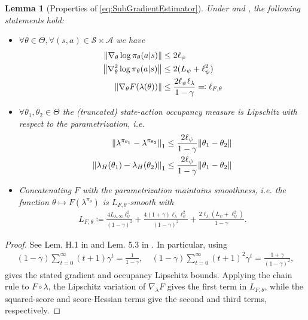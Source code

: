 \documentclass{article}
\theoremstyle{plain}
\newtheorem{lemma}[theorem]{Lemma}
\theoremstyle{definition}
\theoremstyle{remark}
\def\SS{{\mathcal{S}}}
\def\AA{{\mathcal{A}}}
\DeclarePairedDelimiter{\norm}{\lVert}{\rVert}
\newcommand{\define}{\coloneqq}
\newcommand{\defineRev}{\eqqcolon}
\def\ss{{s}}
\def\aa{{a}}
\def\ss{{s}}
\begin{document}
\begin{lemma}[Properties of \eqref{eq:SubGradientEstimator}]
 \label{lem:AppendixScoreFunction}
 Under  and  , the following
 statements hold:
 \begin{itemize}
  \item $\forall \theta \in \Theta, \forall (\ss,\aa) \in \SS \times \AA$
        we have
        \begin{align*}
         \norm*{\nabla_\theta \log \pi_\theta(\aa\vert \ss)}       & \leq 2 \ell_{\psi}                            \\
         \norm*{\nabla^2_{\theta} \log \pi_{\theta}(\aa\vert \ss)} & \leq 2 (L_\psi + \ell_\psi^2)                 \\
         \norm*{\nabla_\theta F(\lambda(\theta))}                  & \leq \frac{2\ell_\psi \ell_\lambda}{1-\gamma}
         \defineRev \ell_{F, \theta}
        \end{align*}
  \item $\forall \theta_1, \theta_2 \in \Theta$ the (truncated) state-action occupancy measure
        is Lipschitz with respect to the parametrization, i.e.
        \begin{align*}
         \norm*{\lambda^{\pi_{\theta_1}} - \lambda^{\pi_{\theta_2}}}_1
          & \leq \frac{2\ell_\psi}{1-\gamma} \norm{\theta_1 - \theta_2} \\
         \norm*{\lambda_H(\theta_1) - \lambda_H(\theta_2)}_1
          & \leq \frac{2\ell_\psi}{1-\gamma} \norm{\theta_1 - \theta_2} \\
        \end{align*}
  \item Concatenating $F$ with the parametrization maintains smoothness, i.e. the
        function $\theta \mapsto F(\lambda^{\pi_\theta})$ is $L_{F, \theta}$-smooth
        with
        \begin{align*}
         L_{F, \theta} \define \frac{4 L_{\lambda, \infty} \ell_\psi^2}{(1-\gamma)^2}
         + \frac{4(1+\gamma)\ell_\lambda\ell_\psi^2}{(1-\gamma)^2}
         + \frac{2\ell_\lambda(L_\psi + \ell_\psi^2)}{1-\gamma}.
        \end{align*}
 \end{itemize}
\end{lemma}
\begin{proof}
 See Lem. H.1 in \citet{barakatReinforcementLearningGeneral2023a} and Lem. 5.3
 in \citet{zhangConvergenceSampleEfficiency2021}.
 In particular, using
 \begin{align*}
  (1-\gamma)\sum_{t=0}^{\infty}(t+1)\gamma^t
  =\frac{1}{1-\gamma},\quad
  (1-\gamma)\sum_{t=0}^{\infty}(t+1)^2\gamma^t
  =\frac{1+\gamma}{(1-\gamma)^2},
 \end{align*}
 gives the stated gradient and occupancy Lipschitz bounds. Applying
 the chain rule to $F\circ\lambda$, the Lipschitz variation of
 $\nabla_\lambda F$ gives the first term in $L_{F,\theta}$, while the
 squared-score and score-Hessian terms give the second and third terms,
 respectively.
\end{proof}
\end{document}
